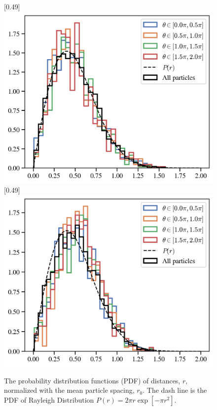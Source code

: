 \documentclass{article}
\begin{document}
\begin{figure}[H]
    \centering
    [0.49\linewidth]{
        \includegraphics[width=\linewidth]{./figs/initDistribution.png}
    }
    \hfill
    [0.49\linewidth]{
        \includegraphics[width=\linewidth]{./figs/finalDistribution.png}
    }
    \caption{
        The probability distribution functions (PDF) of distances, $r$, normalized with the mean particle spacing, $r_0$.
        The dash line is the PDF of Rayleigh Distribution $P(r)=2\pi r\exp\left[-\pi r^2\right]$.
    }
\end{figure}
\end{document}
